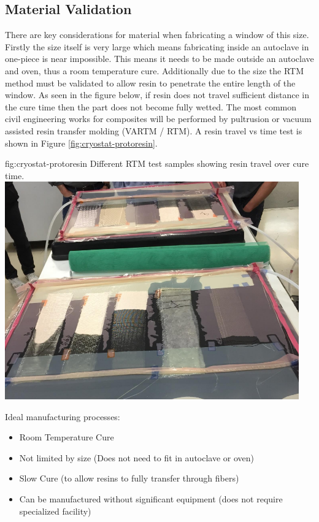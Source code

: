 \subsection{Material Validation}
\label{sec:cryost-proto-matval}

There are key considerations for material when fabricating a window of this size. Firstly the size itself is very large which means fabricating inside an autoclave in one-piece is near impossible. This
means it needs to be made outside an autoclave and oven, thus a room temperature cure.
Additionally due to the size the RTM method must be validated to allow resin to penetrate the entire
length of the window. As seen in the figure below, if resin does not travel sufficient distance in the
cure time then the part does not become fully wetted. The most common civil engineering works for
composites will be performed by pultrusion or vacuum assisted resin transfer molding (VARTM /
RTM).  A resin travel vs time test is shown in Figure \ref{fig:cryostat-protoresin}.

\begin{dunefigure}{fig:cryostat-protoresin}
{Different RTM test samples showing resin travel over cure time.}
\includegraphics[width=0.95\textwidth]{graphics/cryostat/cryostat-protoresin.PNG}
\end{dunefigure}

Ideal manufacturing processes:

\begin{itemize}
    \item Room Temperature Cure
    \item Not limited by size (Does not need to fit in autoclave or oven)
    \item Slow Cure (to allow resins to fully transfer through fibers)
    \item Can be manufactured without significant equipment (does not require specialized facility)
\end{itemize}

